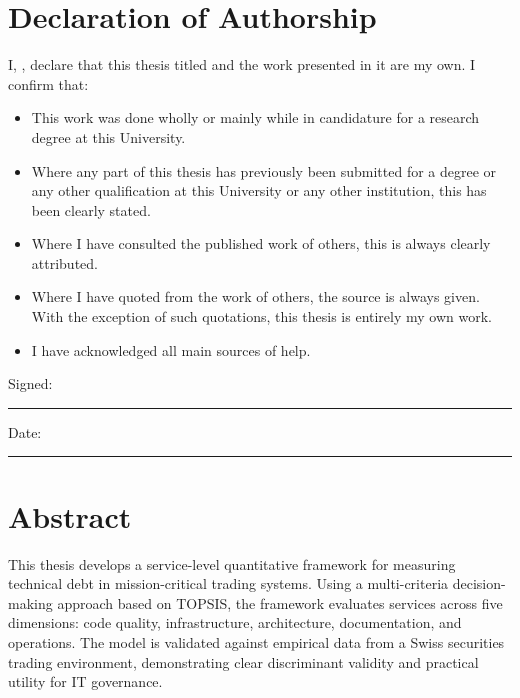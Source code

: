 \documentclass[
  11pt,
  letterpaper,
  11pt,
  english,
  onehalfspacing,
  headsepline]{MastersDoctoralThesis}
\begin{document}

\clearpage
\chapter*{Declaration of Authorship}

\vspace*{\fill}

\noindent I, \authorname, declare that this thesis titled \textit{\ttitle} and the work presented in it are my own. I confirm that:

\begin{itemize}
  \item This work was done wholly or mainly while in candidature for a research degree at this University.
  \item Where any part of this thesis has previously been submitted for a degree or any other qualification at this University or any other institution, this has been clearly stated.
  \item Where I have consulted the published work of others, this is always clearly attributed.
  \item Where I have quoted from the work of others, the source is always given. With the exception of such quotations, this thesis is entirely my own work.
  \item I have acknowledged all main sources of help.
\end{itemize}

\vspace{2cm}
\noindent Signed:\quad\rule[0.5em]{20em}{0.5pt}

\vspace{0.5cm}
\noindent Date:\quad\rule[0.5em]{20em}{0.5pt}

\vspace*{\fill}


\clearpage
\chapter*{Abstract}
This thesis develops a service-level quantitative framework for
measuring technical debt in mission-critical trading systems. Using a
multi-criteria decision-making approach based on TOPSIS, the framework
evaluates services across five dimensions: code quality, infrastructure,
architecture, documentation, and operations. The model is validated
against empirical data from a Swiss securities trading environment,
demonstrating clear discriminant validity and practical utility for IT
governance.
\end{document}
